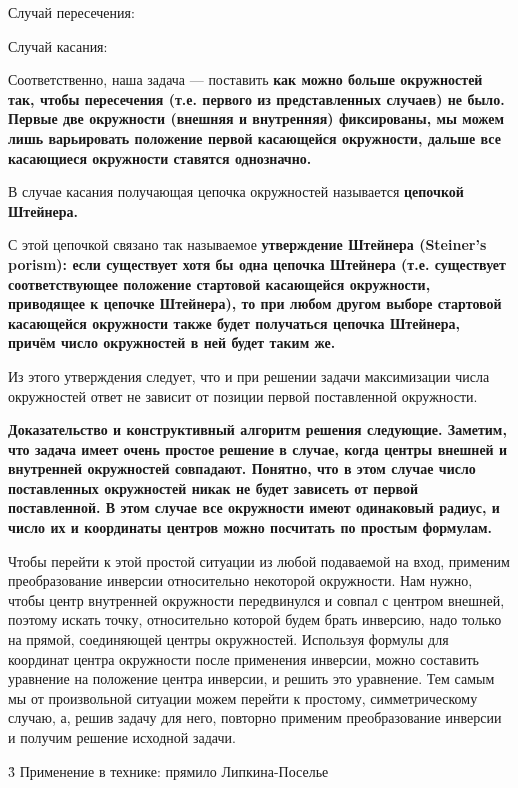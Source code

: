 Случай пересечения:


Случай касания:


Соответственно, наша задача --- поставить \bf{как можно больше} окружностей так, чтобы пересечения (т.е. первого из представленных случаев) не было. Первые две окружности (внешняя и внутренняя) фиксированы, мы можем лишь варьировать положение первой касающейся окружности, дальше все касающиеся окружности ставятся однозначно.

В случае касания получающая цепочка окружностей называется \bf{цепочкой Штейнера}.

С этой цепочкой связано так называемое \bf{утверждение Штейнера} (Steiner's porism): если существует хотя бы одна цепочка Штейнера (т.е. существует соответствующее положение стартовой касающейся окружности, приводящее к цепочке Штейнера), то при любом другом выборе стартовой касающейся окружности также будет получаться цепочка Штейнера, причём число окружностей в ней будет таким же.

Из этого утверждения следует, что и при решении задачи максимизации числа окружностей ответ не зависит от позиции первой поставленной окружности.

\bf{Доказательство} и конструктивный алгоритм решения следующие. Заметим, что задача имеет очень простое решение в случае, когда центры внешней и внутренней окружностей совпадают. Понятно, что в этом случае число поставленных окружностей никак не будет зависеть от первой поставленной. В этом случае все окружности имеют одинаковый радиус, и число их и координаты центров можно посчитать по простым формулам.

Чтобы перейти к этой простой ситуации из любой подаваемой на вход, применим преобразование инверсии относительно некоторой окружности. Нам нужно, чтобы центр внутренней окружности передвинулся и совпал с центром внешней, поэтому искать точку, относительно которой будем брать инверсию, надо только на прямой, соединяющей центры окружностей. Используя формулы для координат центра окружности после применения инверсии, можно составить уравнение на положение центра инверсии, и решить это уравнение. Тем самым мы от произвольной ситуации можем перейти к простому, симметрическому случаю, а, решив задачу для него, повторно применим преобразование инверсии и получим решение исходной задачи.


\h3{ Применение в технике: прямило Липкина-Поселье }

